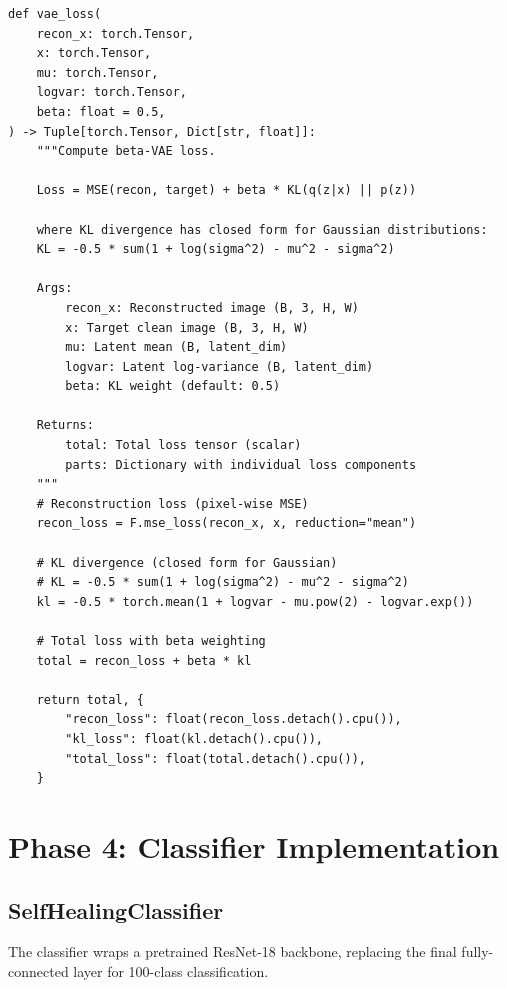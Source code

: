 \documentclass[11pt,a4paper]{article}
\begin{document}
\begin{lstlisting}[caption={src/conv\_vae.py - VAE Loss Function}, label={lst:vae-loss}]
def vae_loss(
    recon_x: torch.Tensor,
    x: torch.Tensor,
    mu: torch.Tensor,
    logvar: torch.Tensor,
    beta: float = 0.5,
) -> Tuple[torch.Tensor, Dict[str, float]]:
    """Compute beta-VAE loss.

    Loss = MSE(recon, target) + beta * KL(q(z|x) || p(z))

    where KL divergence has closed form for Gaussian distributions:
    KL = -0.5 * sum(1 + log(sigma^2) - mu^2 - sigma^2)

    Args:
        recon_x: Reconstructed image (B, 3, H, W)
        x: Target clean image (B, 3, H, W)
        mu: Latent mean (B, latent_dim)
        logvar: Latent log-variance (B, latent_dim)
        beta: KL weight (default: 0.5)

    Returns:
        total: Total loss tensor (scalar)
        parts: Dictionary with individual loss components
    """
    # Reconstruction loss (pixel-wise MSE)
    recon_loss = F.mse_loss(recon_x, x, reduction="mean")

    # KL divergence (closed form for Gaussian)
    # KL = -0.5 * sum(1 + log(sigma^2) - mu^2 - sigma^2)
    kl = -0.5 * torch.mean(1 + logvar - mu.pow(2) - logvar.exp())

    # Total loss with beta weighting
    total = recon_loss + beta * kl

    return total, {
        "recon_loss": float(recon_loss.detach().cpu()),
        "kl_loss": float(kl.detach().cpu()),
        "total_loss": float(total.detach().cpu()),
    }
\end{lstlisting}

\newpage
\section{Phase 4: Classifier Implementation}
\label{sec:phase4}

\subsection{SelfHealingClassifier}

The classifier wraps a pretrained ResNet-18 backbone, replacing the final fully-connected layer for 100-class classification.
\end{document}
